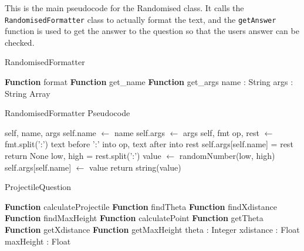 \clearpage
This is the main pseudocode for the Randomised class. It calls the \texttt{RandomisedFormatter} class to actually format the text, and the \texttt{getAnswer} function is used to get the answer to the question so that the users answer can be checked.
\begin{algorithm}[h]\label{randomisedFormatter}
	\caption{RandomisedFormatter}
	\begin{algorithmic}[1]
		\public
		\State \textbf{Function} format
		\State \textbf{Function} get\_name
		\State \textbf{Function} get\_args
		\endpublic
		\private
		\State name : String
		\State args : String Array
		\endprivate
		\EndProcedure
	\end{algorithmic}
\end{algorithm}
\begin{algorithm}[h]
\label{randomformatterps}
\caption{RandomisedFormatter Pseudocode}
	\begin{algorithmic}[1]
		 {self, name, args}
		\State self.name $\gets$ name
		\State self.args $\gets$ args
		\EndFunction
		 {self, fmt}
		\State op, rest $\gets$ fmt.split(':') \Comment text before ':' into op, text after into  rest
		\State self.args[self.name] = rest
		\State return None
		\EndIf
		\State low, high = rest.split(':')
		\State value $\gets$ randomNumber(low, high)
		\State self.args[self.name] $\gets$ value
		\State return string(value)
		\EndIf
		\EndFunction
		\EndProcedure
	\end{algorithmic}
\end{algorithm}
\begin{algorithm}[h]\label{ProjectileQuestion}
	\caption{ProjectileQuestion}
	\begin{algorithmic}[1]
		\public
		\State \textbf{Function} calculateProjectile
		\State \textbf{Function} findTheta
		\State \textbf{Function} findXdistance
		\State \textbf{Function} findMaxHeight
		\State \textbf{Function} calculatePoint
		\State \textbf{Function} getTheta
		\State \textbf{Function} getXdistance
		\State \textbf{Function} getMaxHeight
		\endpublic
		\private
		\State theta : Integer
		\State xdistance : Float
		\State maxHeight : Float
		\endprivate
		\EndProcedure
	\end{algorithmic}
\end{algorithm}
